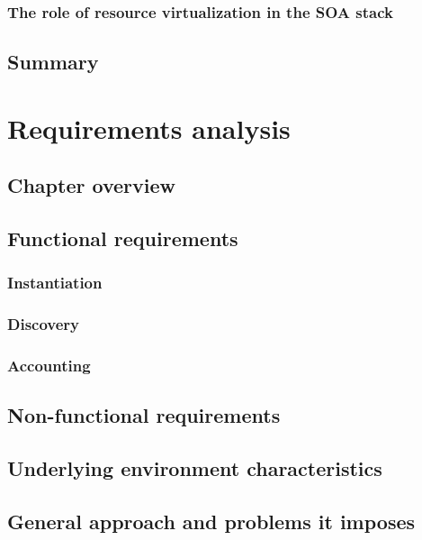 \documentclass[11pt]{book}
\begin{document}
      \subsection{The role of resource virtualization in the SOA stack}


    \section*{Summary}


  \chapter{Requirements analysis}
    
    \section*{Chapter overview}

    \section{Functional requirements}

      \subsection{Instantiation}

      \subsection{Discovery}

      \subsection{Accounting}  %


    \section{Non-functional requirements}

    \section{Underlying environment characteristics}

    \section{General approach and problems it imposes}
\end{document}
